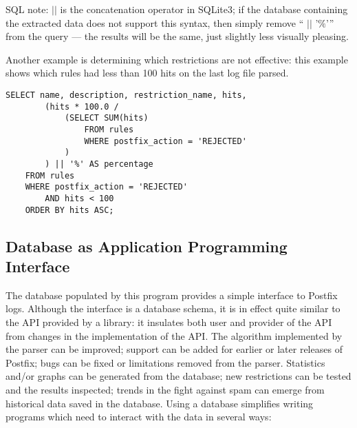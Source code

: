 \documentclass[a4paper,12pt,draft]{article}
\begin{document}
SQL note: $||$ is the concatenation operator in SQLite3; if the database
containing the extracted data does not support this syntax, then simply
remove `` $||$ '$\%$'\hspace{1ex}'' from the query --- the results will be
the same, just slightly less visually pleasing.

Another example is determining which restrictions are not effective: this
example shows which rules had less than 100 hits on the last log file
parsed.

\begin{verbatim}
SELECT name, description, restriction_name, hits,
        (hits * 100.0 /
            (SELECT SUM(hits)
                FROM rules
                WHERE postfix_action = 'REJECTED'
            )
        ) || '%' AS percentage
    FROM rules
    WHERE postfix_action = 'REJECTED'
        AND hits < 100
    ORDER BY hits ASC;
\end{verbatim}

\subsection{Database as Application Programming Interface}

The database populated by this program provides a simple interface to
Postfix logs.  Although the interface is a database schema, it is in effect
quite similar to the API provided by a library: it insulates both user and
provider of the API from changes in the implementation of the API\@.  The
algorithm implemented by the parser can be improved; support can be added
for earlier or later releases of Postfix; bugs can be fixed or limitations
removed from the parser.  Statistics and/or graphs can be generated from
the database; new restrictions can be tested and the results inspected;
trends in the fight against spam can emerge from historical data saved in
the database.  Using a database simplifies writing programs which need to
interact with the data in several ways:
\end{document}
